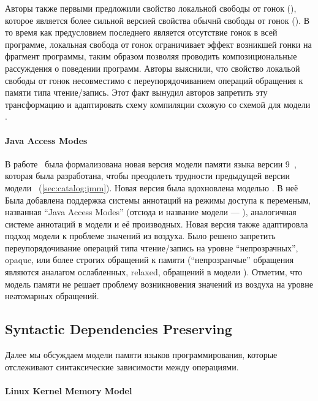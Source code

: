 Авторы также первыми предложили свойство локальной свободы от гонок (\lDRF),
которое является более сильной версией свойства обычнй свободы от гонок (\eDRF).
В то время как предусловием последнего является отсутствие 
гонок в всей программе, локальная свобода от гонок 
ограничивает эффект возникшей гонки на фрагмент программы, 
таким образом позволяя проводить композициональные рассуждения 
о поведении программ. 
Авторы выяснили, что свойство локальой свободы от гонок 
несовместимо с переупорядочиванием операций обращения к памяти типа чтение/запись.  
Этот факт вынудил авторов запретить эту трансформацию 
и адаптировать схему компиляции схожую со схемой для модели \RCMM. 

\paragraph{Java Access Modes}

В работе~\cite{Bender-Palsberg:OOPSLA19} была формализована 
новая версия модели памяти языка \Java версии 9~\cite{JDK9-VarHandle, JEP:193, JDK9-Modes}, 
которая была разработана, чтобы преодолеть трудности 
предыдущей версии модели~\cite{Manson-al:POPL05} 
(\see \ref{sec:catalog:jmm}).
Новая версия была вдохновлена моделью \RCMM.
В неё Была добавлена поддержка системы аннотаций на режимы доступа к переменым, 
названная ``Java Access Modes'' (отсюда и название модели --- \JAM),
аналогичная системе аннотаций в модели \CMM и её производных. 
Новая версия также адаптировла подход модели \RCMM к 
проблеме значений из воздуха. 
Было решено запретить переупорядочивание операций типа чтение/запись 
на уровне ``непрозрачных'', opaque, или более строгих обращений к памяти
(``непрозранчые'' обращения являются аналагом ослабленных, relaxed, 
обращений в модели \CPP).
Отметим, что модель памяти \JAM не решает проблему возникновения значений 
из воздуха на уровне неатомарных обращений. 

\subsection{Syntactic Dependencies Preserving}
\label{sec:catalog:deprf}

Далее мы обсуждаем модели памяти языков программирования, 
которые отслеживают синтаксические зависимости между операциями. 

\paragraph{Linux Kernel Memory Model}

